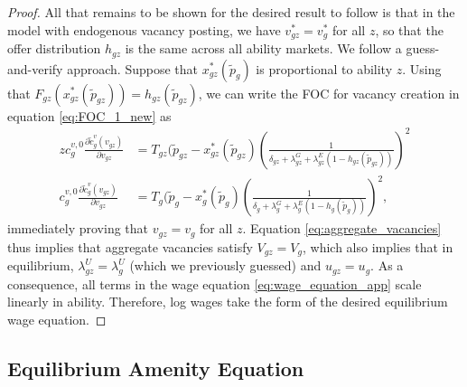 \begin{proof}
    All that remains to be shown for the desired result to follow is that in the model with endogenous vacancy posting, we have $v_{gz}^{*} = v_{g}^{*}$ for all $z$, so that the offer distribution $h_{gz}$ is the same across all ability markets. We follow a guess-and-verify approach. Suppose that $x_{gz}^{*}(\tilde{p}_{g})$ is proportional to ability $z$. Using that $F_{gz}(x_{gz}^{*}(\tilde{p}_{gz})) = h_{gz}(\tilde{p}_{gz})$, we can write the FOC for vacancy creation in equation \eqref{eq:FOC_1_new} as
    \begin{align}
        z c_{g}^{v,0} \frac{\partial \tilde{c}_{g}^{v}(v_{gz})}{\partial v_{gz}} & = T_{gz} (\tilde{p}_{gz} - x_{gz}^{*}(\tilde{p}_{gz}) \left( \frac{1}{\delta_{gz} + \lambda_{gz}^{G} + \lambda_{gz}^{E} (1 - h_{gz}(\tilde{p}_{gz}))} \right)^2 \\
        c_{g}^{v,0} \frac{\partial \tilde{c}_{g}^{v}(v_{gz})}{\partial v_{gz}} & = T_{g} (\tilde{p}_{g} - x_{g}^{*}(\tilde{p}_{g}) \left( \frac{1}{\delta_{g} + \lambda_{g}^{G} + \lambda_{g}^{E} (1 - h_{g}(\tilde{p}_{g}))} \right)^2,
    \end{align}
    immediately proving that $v_{gz} = v_{g}$ for all $z$. Equation \eqref{eq:aggregate_vacancies} thus implies that aggregate vacancies satisfy $V_{gz} = V_{g}$, which also implies that in equilibrium, $\lambda_{gz}^{U} = \lambda_{g}^{U}$ (which we previously guessed) and $u_{gz} = u_{g}$. As a consequence, all terms in the wage equation \eqref{eq:wage_equation_app} scale linearly in ability. Therefore, log wages take the form of the desired equilibrium wage equation.
\end{proof}


\subsection{Equilibrium Amenity Equation\label{app:equm_amenity_eq}}

